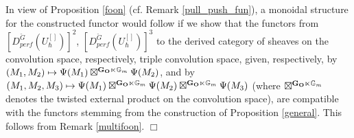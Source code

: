 \documentclass[11pt]{amsart}
\theoremstyle{definition}
\theoremstyle{remark}
\theoremstyle{remark}
\newcommand{\<}{\langle}
\renewcommand{\>}{\rangle}
\newcommand{\LG}{{\check{G}}}
\newcommand{\GO}{{\bf G_O}}
\newcommand{\Gm}{{{\mathbb G}_m}}
\newcommand{\Duh}{{U_\hbar^{[]}}}
\begin{document}
In view of Proposition \ref{foon} (cf. Remark \ref{pull_push_fun}), 
a monoidal structure 
for the constructed functor would follow if we show that the functors
from $[D^\LG_{perf}(\Duh)]^2$, $[D^\LG_{perf}(\Duh)]^3$ to the derived category
of sheaves on the convolution space, respectively, 
triple convolution space, given, respectively,
by $(M_1,M_2) \mapsto \Psi(M_1)\boxtimes^{\GO\ltimes \Gm} \Psi(M_2)$,
and by $(M_1,M_2,M_3) \mapsto \Psi(M_1)\boxtimes^{\GO\ltimes \Gm} \Psi(M_2)
\boxtimes^{\GO\ltimes \Gm} \Psi(M_3)$
 (where $\boxtimes^{\GO\ltimes \Gm}$
denotes the twisted external product on the convolution space), are
 compatible with the functors stemming from the construction
of Proposition \ref{general}. This follows from Remark \ref{multifoon}. \hfill $\Box$
\end{document}
